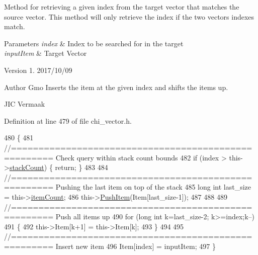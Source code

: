 Method for retrieving a given index from the target vector that matches the source vector. This method will only retrieve the index if the two vectors indexes match.


\begin{DoxyParams}{Parameters}
{\em index} & Index to be searched for in the target \\
\hline
{\em input\+Item} & Target Vector\\
\hline
\end{DoxyParams}
\begin{DoxyVersion}{Version}
1. 2017/10/09 
\end{DoxyVersion}
\begin{DoxyAuthor}{Author}
Gmo Inserts the item at the given index and shifts the items up.

J\+IC Vermaak 
\end{DoxyAuthor}


Definition at line 479 of file chi\+\_\+vector.\+h.


\begin{DoxyCode}
480 \{
481     \textcolor{comment}{//===================================================== Check query within stack count bounds}
482     \textcolor{keywordflow}{if} (index > this->\hyperlink{class_c_h_i___v_e_c_t_o_r_a91ef30712b0ead293dfe1adc29fee555}{stackCount}) \{ \textcolor{keywordflow}{return}; \}
483 
484     \textcolor{comment}{//===================================================== Pushing the last item on top of the stack}
485     \textcolor{keywordtype}{long} \textcolor{keywordtype}{int} last\_size = this->\hyperlink{class_c_h_i___v_e_c_t_o_r_a0d37a8a4650059da0888be2d9c38487a}{itemCount};
486     this->\hyperlink{class_c_h_i___v_e_c_t_o_r_a9a3e5ce973c6bf31abdb55b6dc4cda0e_a9a3e5ce973c6bf31abdb55b6dc4cda0e}{PushItem}(Item[last\_size-1]);
487 
488 
489     \textcolor{comment}{//===================================================== Push all items up}
490     \textcolor{keywordflow}{for} (\textcolor{keywordtype}{long} \textcolor{keywordtype}{int} k=last\_size-2; k>=index;k--)
491     \{
492         this->Item[k+1] = this->Item[k];
493     \}
494 
495     \textcolor{comment}{//===================================================== Insert new item}
496     Item[index] = inputItem;
497 \}
\end{DoxyCode}
\mbox{\label{class_c_h_i___v_e_c_t_o_r_a1b9cf7d3ed0c01de4f1aceb306cb0e65_a1b9cf7d3ed0c01de4f1aceb306cb0e65}} 
